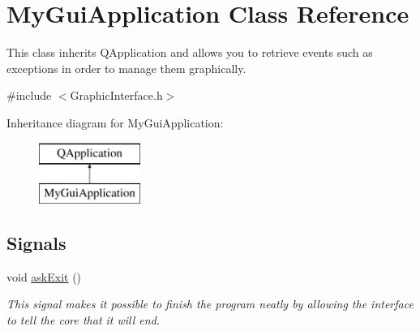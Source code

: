 \hypertarget{class_my_gui_application}{}\section{My\+Gui\+Application Class Reference}
\label{class_my_gui_application}


This class inherits Q\+Application and allows you to retrieve events such as exceptions in order to manage them graphically.  




{\ttfamily \#include $<$Graphic\+Interface.\+h$>$}

Inheritance diagram for My\+Gui\+Application\+:\begin{figure}[H]
\begin{center}
\leavevmode
\includegraphics[height=2.000000cm]{class_my_gui_application}
\end{center}
\end{figure}
\subsection*{Signals}
\begin{DoxyCompactItemize}
\item 
void \hyperlink{class_my_gui_application_a73b056e2f72052b960e94c4776ceda4a}{ask\+Exit} ()
\begin{DoxyCompactList}\small\item\em This signal makes it possible to finish the program neatly by allowing the interface to tell the core that it will end. \end{DoxyCompactList}\end{DoxyCompactItemize}
